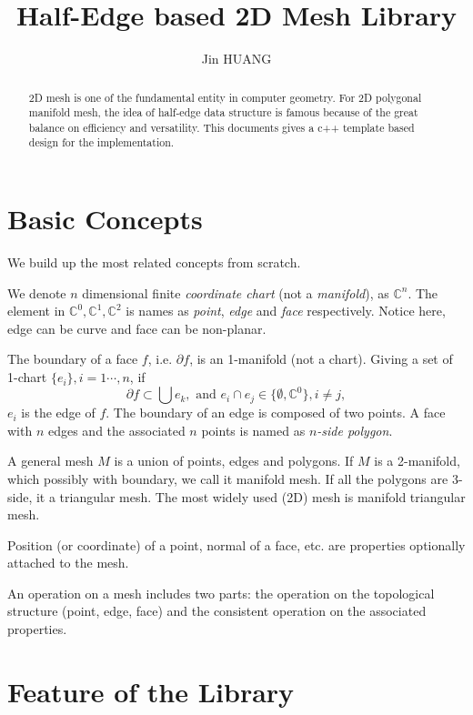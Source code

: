 \documentclass[9pt,twocolumn]{extarticle}
\title{Half-Edge based 2D Mesh Library}
\author{Jin HUANG}
\begin{document}
\maketitle

\begin{abstract}
  2D mesh is one of the fundamental entity in computer geometry.  For
  2D polygonal manifold mesh, the idea of half-edge data structure is
  famous because of the great balance on efficiency and versatility.
  This documents gives a c++ template based design for the
  implementation.
\end{abstract}

\section{Basic Concepts}
We build up the most related concepts from scratch.

We denote $n$ dimensional finite {\em coordinate chart} (not a {\em
  manifold}), as $\mathbb{C}^n$.  The element in $\mathbb{C}^0,
\mathbb{C}^1, \mathbb{C}^2$ is names as {\em point}, {\em edge} and
{\em face} respectively.  Notice here, edge can be curve and face can
be non-planar.

The boundary of a face $f$, i.e. $\partial f$, is an 1-manifold (not a
chart). Giving a set of 1-chart $\{e_i\}, i=1\cdots,n$, if
\begin{equation}
  \partial f \subset \bigcup e_k, \mbox{ and } e_i\cap e_j \in \{\emptyset,  \mathbb{C}^0\}, i \neq j,
\end{equation}
$e_i$ is the edge of $f$.  The boundary of an edge is composed of two
points.  A face with $n$ edges and the associated $n$ points is named
as {\em $n$-side polygon}.

A general mesh $M$ is a union of points, edges and polygons. If $M$ is a 2-manifold,
which possibly with boundary, we call it manifold mesh.  If all the
polygons are $3$-side, it a triangular mesh.  The most widely used
(2D) mesh is manifold triangular mesh.

Position (or coordinate) of a point, normal of a face, etc. are
properties optionally attached to the mesh.

An operation on a mesh includes two parts: the operation on the
topological structure (point, edge, face) and the consistent operation
on the associated properties.

\section{Feature of the Library}
\end{document}
